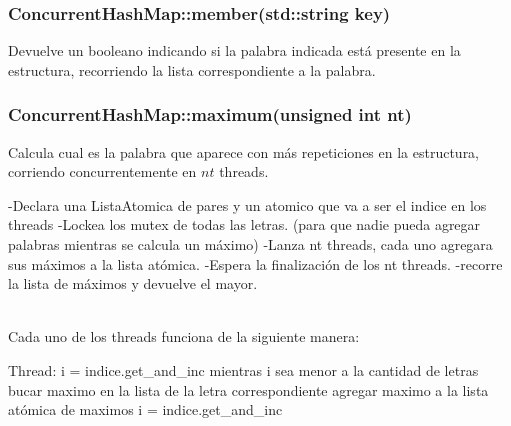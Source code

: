 \subsubsection{ConcurrentHashMap::member(std::string key)}
Devuelve un booleano indicando si la palabra indicada está presente en la estructura, recorriendo la lista correspondiente a la palabra.

\subsubsection{ConcurrentHashMap::maximum(unsigned int nt)}
Calcula cual es la palabra que aparece con más repeticiones en la estructura, corriendo concurrentemente en $nt$ threads.\\
\begin{codesnippet}
 	-Declara una ListaAtomica de pares y un atomico que va a ser el indice en los threads
 	-Lockea los mutex de todas las letras.
 	(para que nadie pueda agregar palabras mientras se calcula un máximo)
 	-Lanza nt threads, cada uno agregara sus máximos a la lista atómica.
 	-Espera la finalización de los nt threads.
 	-recorre la lista de máximos y devuelve el mayor.
\end{codesnippet}\\
Cada uno de los threads funciona de la siguiente manera:\\
\begin{codesnippet}
 	Thread:
 		i = indice.get_and_inc
 		mientras i sea menor a la cantidad de letras
 			bucar maximo en la lista de la letra correspondiente
 			agregar maximo a la lista atómica de maximos
 			i = indice.get_and_inc

\end{codesnippet}\\

